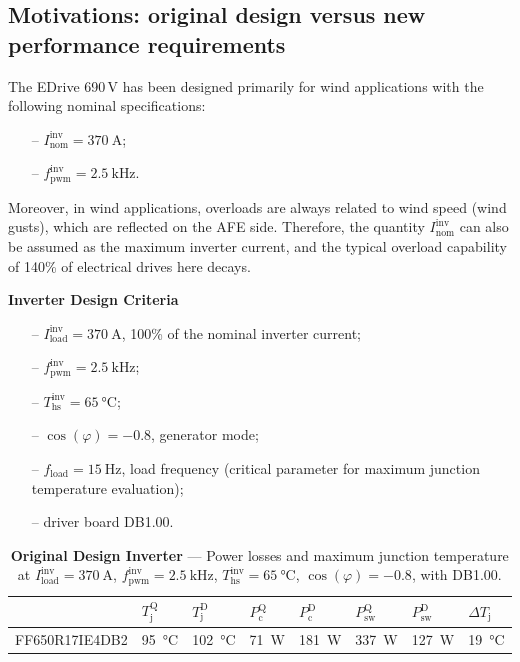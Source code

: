 \documentclass[12pt,a4paper]{scrartcl}
\begin{document}
\begin{onehalfspace}
	\section{Motivations: original design versus new performance requirements}
	The EDrive 690\,V has been designed primarily for wind applications with the following
	nominal specifications:
	\begin{itemize}
		\item[--] $I_\text{nom}^\text{inv} = \SI{370}{\ampere}$;
		\item[--] $f_\text{pwm}^\text{inv} = \SI{2.5}{\kilo\hertz}$.
	\end{itemize}
	Moreover, in wind applications, overloads are always related to wind speed (wind gusts), which are
	reflected on the AFE side. Therefore, the quantity $I_\text{nom}^\text{inv}$ can also be
	assumed as the maximum inverter current, and the typical overload capability of 140\% of electrical drives here decays.
	
	\vspace{5mm}
	\noindent\textbf{Inverter Design Criteria}
	\begin{itemize}
		\item[--] $I_\text{load}^\text{inv} = \SI{370}{\ampere}$, 100\% of the nominal inverter current;
		\item[--] $f_\text{pwm}^\text{inv} = \SI{2.5}{\kilo\hertz}$;
		\item[--] $T_\text{hs}^\text{inv} = \SI{65}{\celsius}$;
		\item[--] $\cos(\varphi) = -0.8$, generator mode;
		\item[--] $f_\text{load} = \SI{15}{\hertz}$, load frequency (critical parameter for maximum junction temperature evaluation);
		\item[--] driver board DB1.00.
	\end{itemize}
	\begin{table}[H]
		\centering
		\captionsetup{width=0.75\textwidth, font=small}
		\caption{\textbf{Original Design Inverter} --- Power losses and maximum junction temperature at $I_\text{load}^\text{inv} = \SI{370}{\ampere}$, $f_\text{pwm}^\text{inv} = \SI{2.5}{\kilo\hertz}$, $T_\text{hs}^\text{inv} = \SI{65}{\celsius}$, $\cos(\varphi) = -0.8$, with DB1.00.}
		\label{}
		\renewcommand{\arraystretch}{2.0}
		\begin{tabularx}{\textwidth}{Y|Z|Z|Z|Z|Z|Z|Z}
			\hline\hline
			& $T_\text{j}^\text{Q}$ & $T_\text{j}^\text{D}$ & $P_\text{c}^\text{Q}$ & $P_\text{c}^\text{D}$ & $P_\text{sw}^\text{Q}$ & $P_\text{sw}^\text{D}$ & $\Delta T_\text{j}$ \\
			\hline
			FF650R17IE4DB2 & \SI{95}{\celsius} & \SI{102}{\celsius}  & \SI{71}{\watt} & \SI{181}{\watt}  & \SI{337}{\watt}  & \SI{127}{\watt} & \SI{19}{\celsius} \\
			\hline\hline
		\end{tabularx}
	\end{table}
	

\end{onehalfspace}
\end{document}

